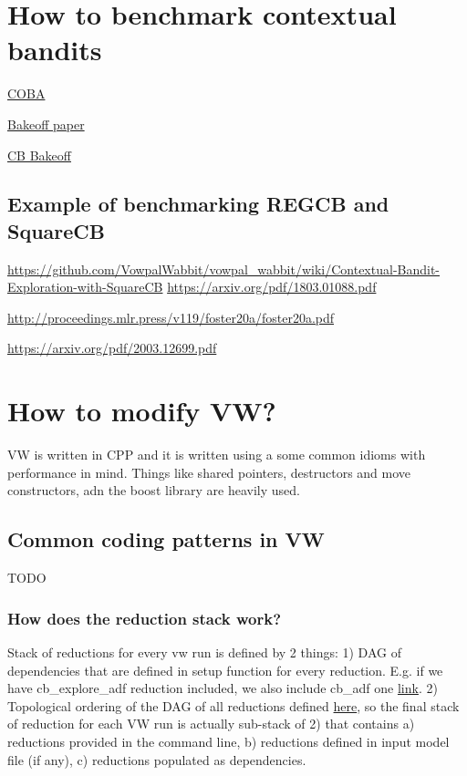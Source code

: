 \documentclass[preview,border={30 30 30 30}]{standalone}
\begin{document}
\section{How to benchmark contextual bandits}
\href{https://github.com/VowpalWabbit/coba}{COBA}

\href{https://arxiv.org/pdf/1802.04064v3.pdf}{Bakeoff paper}

\href{https://github.com/albietz/cb_bakeoff}{CB Bakeoff}

\subsection{Example of benchmarking REGCB and SquareCB}
\url{https://github.com/VowpalWabbit/vowpal_wabbit/wiki/Contextual-Bandit-Exploration-with-SquareCB}
\url{https://arxiv.org/pdf/1803.01088.pdf}

\url{http://proceedings.mlr.press/v119/foster20a/foster20a.pdf}

\url{https://arxiv.org/pdf/2003.12699.pdf}


\section{How to modify VW?}
VW is written in CPP and it is written using a some common idioms with performance in mind. Things like shared pointers, destructors and move constructors, adn the boost library are heavily used.


\subsection{Common coding patterns in VW}
TODO

\subsubsection{How does the reduction stack work?}
Stack of reductions for every vw run is defined by 2 things: 1) DAG of dependencies that are defined in setup function for every reduction. E.g.  if we have cb\_explore\_adf reduction included, we also include cb\_adf one \href{https://github.com/VowpalWabbit/vowpal_wabbit/blob/b8732ffec3f8c7150dace1c41434bf3cdb4d8436/vowpalwabbit/cb_explore_adf_greedy.cc#L96}{link}. 2) Topological ordering of the DAG of all reductions defined \href{https://github.com/VowpalWabbit/vowpal_wabbit/blob/b8732ffec3f8c7150dace1c41434bf3cdb4d8436/vowpalwabbit/parse_args.cc#L1246}{here}, so the final stack of reduction for each VW run is actually sub-stack of 2) that contains a) reductions provided in the command line, b) reductions defined in input model file (if any), c) reductions populated as dependencies. 
\end{document}
